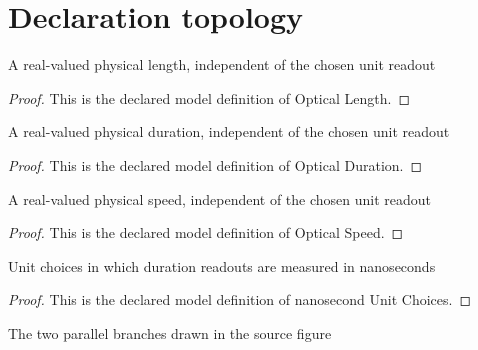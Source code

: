 \section{Declaration topology}
\begin{definition}
  \label{def:physics:phyx-mini-0092:phyxminiproblems-problemphyxmini0092-opticallength}
  A real-valued physical length, independent of the chosen unit readout
\end{definition}
\begin{proof}
  This is the declared model definition of Optical Length.
\end{proof}
\begin{definition}
  \label{def:physics:phyx-mini-0092:phyxminiproblems-problemphyxmini0092-opticalduration}
  A real-valued physical duration, independent of the chosen unit readout
\end{definition}
\begin{proof}
  This is the declared model definition of Optical Duration.
\end{proof}
\begin{definition}
  \label{def:physics:phyx-mini-0092:phyxminiproblems-problemphyxmini0092-opticalspeed}
  A real-valued physical speed, independent of the chosen unit readout
\end{definition}
\begin{proof}
  This is the declared model definition of Optical Speed.
\end{proof}
\begin{definition}
  \label{def:physics:phyx-mini-0092:phyxminiproblems-problemphyxmini0092-nanosecondunitchoices}
  Unit choices in which duration readouts are measured in nanoseconds
\end{definition}
\begin{proof}
  This is the declared model definition of nanosecond Unit Choices.
\end{proof}
\begin{definition}
  \label{def:physics:phyx-mini-0092:phyxminiproblems-problemphyxmini0092-beambranch}
  The two parallel branches drawn in the source figure
\end{definition}
